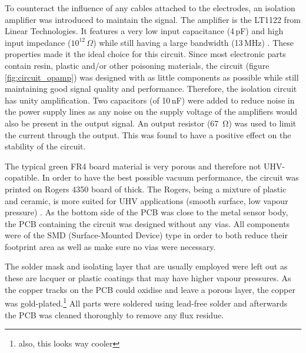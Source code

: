 To counteract the influence of any cables attached to the electrodes, an isolation amplifier was introduced to maintain the signal.
The amplifier is the LT1122 from Linear Technologies. It features a very low input capacitance (4\,pF) and high input impedance ($10^{12}\,\Omega$) while still having a large bandwidth (13\,MHz) \cite{LT1122}. These properties made it the ideal choice for this circuit.
Since most electronic parts contain resin, plastic and/or other poisoning materials, the circuit (figure \ref{fig:circuit_opamp}) was designed with as little components as possible while still maintaining good signal quality and performance. Therefore, the isolation circuit has unity amplification. %
Two capacitors (of 10\,nF) were added to reduce noise in the power supply lines as any noise on the supply voltage of the amplifiers would also be present in the output signal. An output resistor (\SI{67}{\ohm}) was used to limit the current through the output. This was found to have a positive effect on the stability of the circuit.

The typical green FR4 board material is very porous and therefore not UHV-copatible. In order to have the best possible vacuum performance, the circuit was printed on Rogers 4350 board of  thick. The Rogers, being a mixture of plastic and ceramic, is more suited for UHV applications (smooth surface, low vapour pressure) .
As the bottom side of the PCB was close to the metal sensor body, the PCB containing the circuit was designed without any vias. All components were of the SMD (Surface-Mounted Device) type in order to both reduce their footprint area as well as make sure no vias were necessary.

The solder mask and isolating layer that are usually employed were left out as these are lacquer or plastic coatings that may have higher vapour pressures.
As the copper tracks on the PCB could oxidise and leave a porous layer, the copper was gold-plated.\footnote{also, this looks way cooler}
All parts were soldered using lead-free solder and afterwards the PCB was cleaned thoroughly to remove any flux residue.

